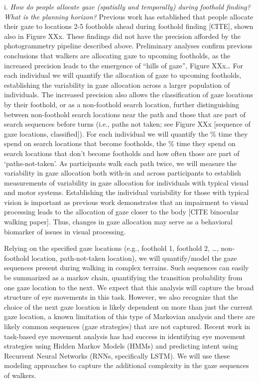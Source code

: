 \documentclass[
]{article}
\begin{document}
i. \emph{How do people allocate gaze (spatially and temporally) during
foothold finding? What is the planning horizon?} Previous work has
established that people allocate their gaze to locations 2-5 footholds
ahead during foothold finding {[}CITE{]}, shown also in Figure XXx.
These findings did not have the precision afforded by the photogrammetry
pipeline described above. Preliminary analyses confirm previous
conclusions that walkers are allocating gaze to upcoming footholds, as
the increased precision leads to the emergence of ``hills of gaze'',
Figure XXx\ldots{} For each individual we will quantify the allocation
of gaze to upcoming footholds, establishing the variability in gaze
allocation across a larger population of individuals. The increased
precision also allows the classification of gaze locations by their
foothold, or as a non-foothold search location, further distinguishing
between non-foothold search locations near the path and those that are
part of search sequences before turns (i.e., paths not taken; see Figure
XXx {[}sequence of gaze locations, classified{]}). For each individual
we will quantify the \% time they spend on search locations that become
footholds, the \% time they spend on search locations that don't become
footholds and how often those are part of `paths-not-taken'. As
participants walk each path twice, we will measure the variability in
gaze allocation both with-in and across participants to establish
measurements of variability in gaze allocation for individuals with
typical visual and motor systems. Establishing the individual
variability for those with typical vision is important as previous work
demonstrates that an impairment to visual processing leads to the
allocation of gaze closer to the body {[}CITE binocular walking
paper{]}. Thus, changes in gaze allocation may serve as a behavioral
biomarker of issues in visual processing.

Relying on the specified gaze locations (e.g., foothold 1, foothold 2,
\ldots, non-foothold location, path-not-taken location), we will
quantify/model the gaze sequences present during walking in complex
terrains. Such sequences can easily be summarized as a markov chain,
quantifying the transition probability from one gaze location to the
next. We expect that this analysis will capture the broad structure of
eye movements in this task. However, we also recognize that the choice
of the next gaze location is likely dependent on more than just the
current gaze location, a known limitation of this type of Markovian
analysis and there are likely common sequences (gaze strategies) that
are not captured. Recent work in task-based eye movement analysis has
had success in identifying eye movement strategies using Hidden Markov
Models (HMMs) and predicting intent using Recurrent Neural Networks
(RNNs, specifically LSTM). We will use these modeling approaches to
capture the additional complexity in the gaze sequences of walkers.
\end{document}
